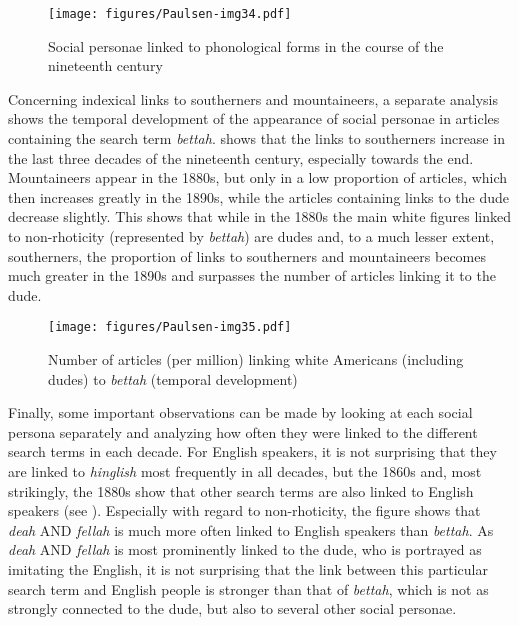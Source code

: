 \begin{figure}
\texttt{[image: figures/Paulsen-img34.pdf]}
\caption{
Social personae linked to phonological forms in the course of the nineteenth century
}
\label{fig:key:34}
\end{figure}

Concerning indexical links to southerners and mountaineers, a separate analysis shows the temporal development of the appearance of social personae in articles containing the search term \emph{bettah}.  shows that the links to southerners increase in the last three decades of the nineteenth century, especially towards the end. Mountaineers appear in the 1880s, but only in a low proportion of articles, which then increases greatly in the 1890s, while the articles containing links to the dude decrease slightly. This shows that while in the 1880s the main white figures linked to non-rhoticity (represented by \emph{bettah}) are dudes and, to a much lesser extent, southerners, the proportion of links to southerners and mountaineers becomes much greater in the 1890s and surpasses the number of articles linking it to the dude.




\begin{figure}
\texttt{[image: figures/Paulsen-img35.pdf]}
\caption{
Number of articles (per million) linking white Americans (including dudes) to \emph{bettah} (temporal development)
}
\label{fig:key:35}
\end{figure}

Finally, some important observations can be made by looking at each social persona separately and analyzing how often they were linked to the different search terms in each decade. For English speakers, it is not surprising that they are linked to \emph{hinglish} most frequently in all decades, but the 1860s and, most strikingly, the 1880s show that other search terms are also linked to English speakers (see ). Especially with regard to non-rhoticity, the figure shows that \emph{deah} AND \emph{fellah} is much more often linked to English speakers than \emph{bettah}. As \emph{deah} AND \emph{fellah} is most prominently linked to the dude, who is portrayed as imitating the English, it is not surprising that the link between this particular search term and English people is stronger than that of \emph{bettah}, which is not as strongly connected to the dude, but also to several other social personae.


